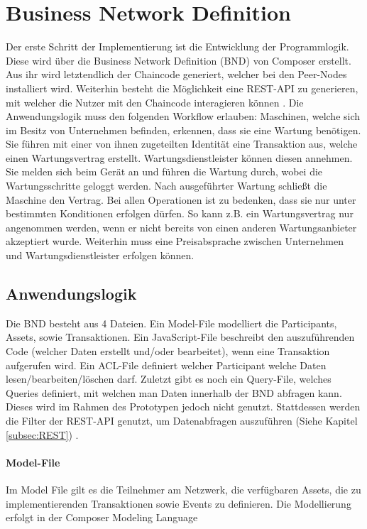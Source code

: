 \section{Business Network Definition}
Der erste Schritt der Implementierung ist die Entwicklung der Programmlogik. Diese wird über die Business Network Definition (BND) von Composer erstellt. Aus ihr wird letztendlich der Chaincode generiert, welcher bei den Peer-Nodes installiert wird. Weiterhin besteht die Möglichkeit eine REST-API zu generieren, mit welcher die Nutzer mit den Chaincode interagieren können \cite{HyperledgerComposerTeamDeveloperTutorialHyperledger}. Die Anwendungslogik muss den folgenden Workflow erlauben: Maschinen, welche sich im Besitz von Unternehmen befinden, erkennen, dass sie eine Wartung benötigen. Sie führen mit einer von ihnen zugeteilten Identität eine Transaktion aus, welche einen Wartungsvertrag erstellt. Wartungsdienstleister können diesen annehmen. Sie melden sich beim Gerät an und führen die Wartung durch, wobei die Wartungsschritte geloggt werden. Nach ausgeführter Wartung schließt die Maschine den Vertrag. Bei allen Operationen ist zu bedenken, dass sie nur unter bestimmten Konditionen erfolgen dürfen. So kann z.B. ein Wartungsvertrag nur angenommen werden, wenn er nicht bereits von einen anderen Wartungsanbieter akzeptiert wurde. Weiterhin muss eine Preisabsprache zwischen Unternehmen und Wartungsdienstleister erfolgen können. 

\subsection{Anwendungslogik}
Die BND besteht aus 4 Dateien. Ein Model-File modelliert die Participants, Assets, sowie Transaktionen. Ein JavaScript-File beschreibt den auszuführenden Code (welcher Daten erstellt und/oder bearbeitet), wenn eine Transaktion aufgerufen wird. Ein ACL-File definiert welcher Participant welche Daten lesen/bearbeiten/löschen darf. Zuletzt gibt es noch ein Query-File, welches Queries definiert, mit welchen man Daten innerhalb der BND abfragen kann. Dieses wird im Rahmen des Prototypen jedoch nicht genutzt. Stattdessen werden die Filter der REST-API genutzt, um Datenabfragen auszuführen (Siehe Kapitel \ref{subsec:REST}) \cite{HyperledgerComposerTeamIntroductionHyperledgerComposer}.

\paragraph{Model-File}
Im Model File gilt es die Teilnehmer am Netzwerk, die verfügbaren Assets, die zu implementierenden Transaktionen sowie Events zu definieren. Die Modellierung erfolgt in der Composer Modeling Language \cite{HyperledgerComposerTeamModelingLanguageHyperledger}

